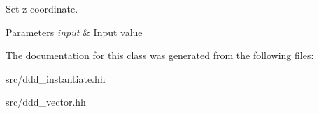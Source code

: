 Set z coordinate. 


\begin{DoxyParams}{Parameters}
{\em input} & Input value \\
\hline
\end{DoxyParams}


The documentation for this class was generated from the following files\+:\begin{DoxyCompactItemize}
\item 
src/ddd\+\_\+instantiate.\+hh\item 
src/ddd\+\_\+vector.\+hh\end{DoxyCompactItemize}
